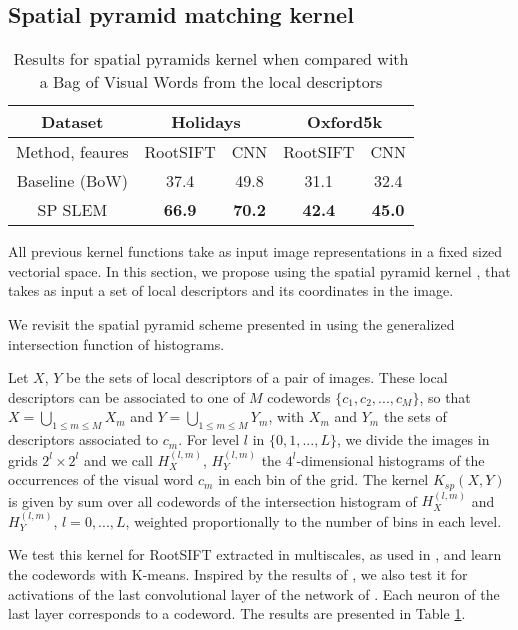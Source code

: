 \subsection{Spatial pyramid matching kernel}

\begin{table}[!t]
    \centering
    \caption{Results for spatial pyramids kernel when compared with a Bag of Visual Words from the local descriptors  }
    \setlength{\tabcolsep}{.5em}
    \begin{tabular}{ccccc}
      \toprule
    Dataset & \multicolumn{2}{c}{\textbf{Holidays}} & \multicolumn{2}{c}{\textbf{Oxford5k}}\\
      \midrule
        Method, feaures & RootSIFT & CNN & RootSIFT
        &CNN \\
      \midrule
    Baseline (BoW) & 37.4 & 49.8 & 31.1 & 32.4 \\
        SP SLEM    & \textbf{66.9} & \textbf{70.2} & \textbf{42.4} & \textbf{45.0} \\
      \bottomrule
    \end{tabular}
    \label{tab:spk}
\end{table}
All previous kernel functions take as input image representations in a fixed sized vectorial space. In this section, we propose using the spatial pyramid kernel \cite{GrauDa05}, that takes as input a set of local descriptors and its coordinates in the image.

We revisit the spatial pyramid scheme presented in \cite{spk} using the generalized intersection function of histograms.

Let $X$, $Y$ be the sets of local descriptors of a pair of images.
These local descriptors can be associated to one of $M$ codewords $\{c_1,c_2,...,c_M\}$, so that $X=\bigcup_{1\leq m \leq M}X_m$ and $Y=\bigcup_{1\leq m \leq M}Y_m$, with $X_m$ and $Y_m$ the sets of descriptors associated to $c_m$.
For level $l$ in $\{0,1,..., L\}$, we divide the images in grids $2^l\times 2^l$ and we call $H^{(l,m)}_X$, $H^{(l,m)}_Y$ the $4^l$-dimensional histograms of the occurrences of the visual word $c_m$ in each bin of the grid.
The kernel $K_{sp}(X,Y)$ is given by sum over all codewords of the intersection histogram of $H^{(l,m)}_X$ and $H^{(l,m)}_Y$, $l=0,...,L$,  weighted proportionally to the number of bins in each level.

We test this kernel for RootSIFT extracted in multiscales, as used in \cite{spk}, and learn the codewords with K-means. Inspired by the results of \cite{SPPCNN}, we also test it for activations of the last convolutional layer of the network of \cite{SimonZisser15}. Each neuron of the last layer corresponds to a codeword. The results are presented in Table \ref{tab:spk}.

